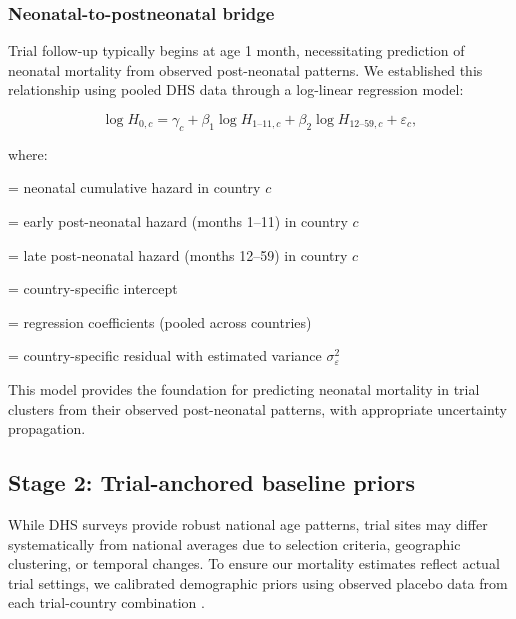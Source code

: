 \documentclass[11pt]{article}\usepackage[]{graphicx}\usepackage[]{xcolor}
\begin{document}
\subsubsection{Neonatal-to-postneonatal bridge}

Trial follow-up typically begins at age 1 month, necessitating prediction of neonatal mortality from observed post-neonatal patterns. We established this relationship using pooled DHS data through a log-linear regression model:

\begin{equation}
\log H_{0,c} = \gamma_c + \beta_1 \log H_{1\text{--}11,c} + \beta_2 \log H_{12\text{--}59,c} + \varepsilon_c,
\end{equation}

\noindent where:
\begin{description}[leftmargin=2em]
\item[$H_{0,c}$] = neonatal cumulative hazard in country $c$
\item[$H_{1\text{--}11,c}$] = early post-neonatal hazard (months 1--11) in country $c$
\item[$H_{12\text{--}59,c}$] = late post-neonatal hazard (months 12--59) in country $c$
\item[$\gamma_c$] = country-specific intercept
\item[$\beta_1, \beta_2$] = regression coefficients (pooled across countries)
\item[$\varepsilon_c$] = country-specific residual with estimated variance $\sigma^2_\varepsilon$
\end{description}

This model provides the foundation for predicting neonatal mortality in trial clusters from their observed post-neonatal patterns, with appropriate uncertainty propagation.

\subsection{Stage 2: Trial-anchored baseline priors}

While DHS surveys provide robust national age patterns, trial sites may differ systematically from national averages due to selection criteria, geographic clustering, or temporal changes. To ensure our mortality estimates reflect actual trial settings, we calibrated demographic priors using observed placebo data from each trial-country combination \citep{oron2020ajtmh}.
\end{document}
